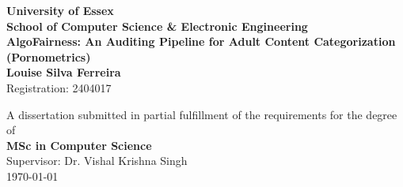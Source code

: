 \documentclass[12pt, a4paper]{report}
\begin{document}
\begin{titlepage}
    \centering
    \vspace*{1cm}
    \textbf{\Large University of Essex} \\
    \vspace{0.5cm}
    \textbf{\large School of Computer Science & Electronic Engineering} \\
    \vspace{1.5cm}
    \textbf{\Huge AlgoFairness: An Auditing Pipeline for Adult Content Categorization} \\
    \vspace{1cm}
    \textbf{\Large (Pornometrics)} \\
    \vspace{2cm}
    \textbf{Louise Silva Ferreira} \\
    Registration: 2404017 \\
    \vspace{1cm}
    
    \vfill
    
    A dissertation submitted in partial fulfillment of the requirements for the degree of \\
    \textbf{MSc in Computer Science} \\
    \vspace{0.8cm}
    Supervisor: Dr. Vishal Krishna Singh \\
    \vspace{1cm}
    \today
\end{titlepage}

\tableofcontents
\listoffigures
\listoftables
\newpage









\appendix

\end{document}

